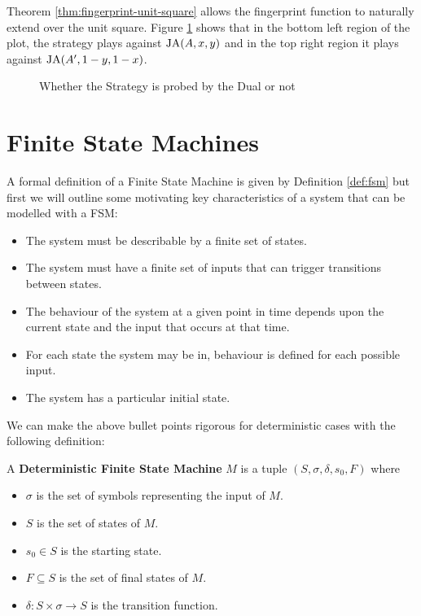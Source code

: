 Theorem \ref{thm:fingerprint-unit-square} allows the fingerprint function to naturally extend over the unit square.
Figure \ref{fig:DualProbe} shows that in the \textcolor{sol-violet}{bottom left} region of the plot, the strategy plays against $\text{JA}(A, x, y)$ and in the \textcolor{sol-cyan}{top right} region it plays against $\text{JA}(A', 1-y, 1-x)$.

\begin{figure}[!hbtp]
    \begin{center}
        
        \caption{Whether the Strategy is probed by the Dual or not}\label{fig:DualProbe}
    \end{center}
\end{figure}

\section{Finite State Machines}

A formal definition of a Finite State Machine is given by Definition \ref{def:fsm} but first we will outline some motivating key characteristics of a system that can be modelled with a FSM:

\begin{itemize}
 \item The system must be describable by a finite set of states.
 \item The system must have a finite set of inputs that can trigger transitions between states.
 \item The behaviour of the system at a given point in time depends upon the current state and the input that occurs at that time.
 \item For each state the system may be in, behaviour is defined for each possible input.
 \item The system has a particular initial state.
\end{itemize}

We can make the above bullet points rigorous for deterministic cases with the following definition:

\begin{definition}\label{def:fsm}
A \textbf{Deterministic Finite State Machine} $M$ is a tuple $(S, \sigma, \delta, s_0, F)$ where
\begin{itemize}
 \item $\sigma$ is the set of symbols representing the input of $M$.
 \item $S$ is the set of states of $M$.
 \item $s_0 \in S$ is the starting state.
 \item $F \subseteq S$ is the set of final states of $M$.
 \item $\delta: S \times \sigma \rightarrow S$ is the transition function.
\end{itemize}
\end{definition}


